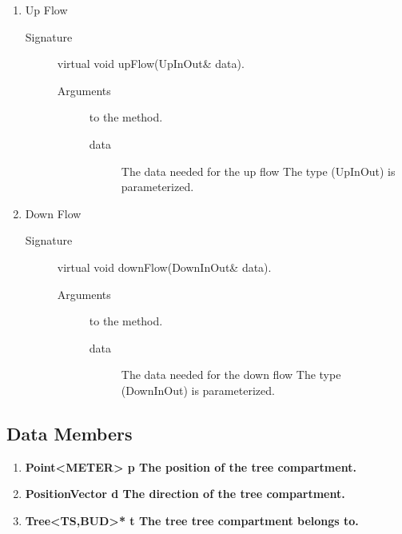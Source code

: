 \begin{enumerate}
\begin{description}
\begin{description}
     \end{description}
 \end{description} 
\item Up Flow  
  \begin{description} 
     \item [Signature] virtual void upFlow(UpInOut\& data).
     \begin{description}
         \item [Arguments] to the method.
            \begin{description} 
                \item [data]  The data needed for the up flow
     The type (UpInOut) is parameterized.
             \end{description}
     \end{description}
  \end{description}
\item Down Flow  
  \begin{description} 
     \item [Signature] virtual void downFlow(DownInOut\& data).
     \begin{description}
         \item [Arguments] to the method.
            \begin{description} 
                \item [data]  The data needed for the down flow
     The type (DownInOut) is parameterized.
             \end{description}
     \end{description}
  \end{description}
\end{enumerate}

\subsection{Data Members}
\begin{enumerate}
\item \bf Point<METER> p \rm The position of the tree compartment.
\item \bf PositionVector d \rm The direction of the tree compartment.
\item \bf Tree<TS,BUD>* t \rm The tree tree compartment belongs to.
\end{enumerate}